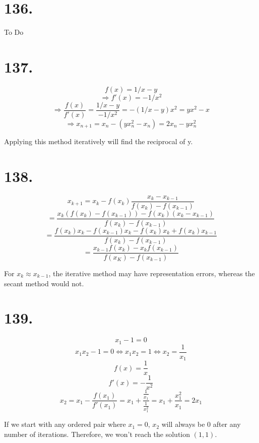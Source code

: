 \documentclass{article}\usepackage[]{graphicx}\usepackage[]{color}
\begin{document}
\section{136.}
To Do
\section{137.}
$$f(x)=1/x-y$$ 
$$\Rightarrow f'(x)=-1/x^2$$
$$\Rightarrow \frac{f(x)}{f'(x)}=\frac{1/x-y}{-1/x^2}=-(1/x-y)x^2=yx^2-x$$ 
$$\Rightarrow x_{n+1}=x_n-(yx_n^2-x_n)=2x_n-yx_n^2$$ 

Applying this method iteratively will find the reciprocal of y.


\section{138.}
$$x_{k+1}=x_k-f(x_k)\frac{x_k-x_{k-1}}{f(x_k)-f(x_{k-1})} $$
  $$=\frac{x_k(f(x_k)-f(x_{k-1}))-f(x_k)(x_k-x_{k-1})}{f(x_k)-f(x_{k-1})}$$
  $$=\frac{f(x_k)x_k-f(x_{k-1})x_k-f(x_k)x_k+f(x_k)x_{k-1}}{f(x_k)-f(x_{k-1})}$$
  $$=\frac{x_{k-1}f(x_k)-x_kf(x_{k-1})}{f(x_K)-f(x_{k-1})} $$

For $x_k\approx x_{k-1}$, the iterative method may have representation errors, whereas the secant method would not.

\section{139.}
  $$ x_1-1=0 $$
  $$ x_1x_2-1=0 \iff x_1x_2=1 \iff x_2=\frac{1}{x_1} $$
  $$f(x)=\frac{1}{x} $$
  $$f'(x)=-\frac{1}{x^2} $$
  $$x_2=x_1-\frac{f(x_1)}{f'(x_1)}=x_1+\frac{\frac{1}{x_1}}{\frac{1}{x_1^2}}=x_1+\frac{x_1^2}{x_1}=2x_1 $$

If we start with any ordered pair where $x_1=0$, $x_2$ will always be 0 after any number of iterations. Therefore, we won't reach the solution $(1,1)$.
\end{document}
